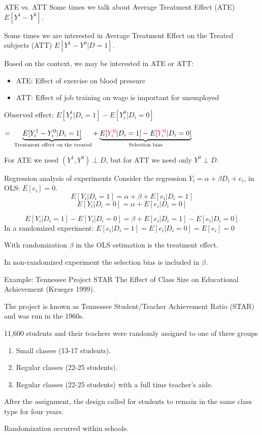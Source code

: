 \documentclass{beamer}
\begin{document}
\begin{frame}{ATE vs. ATT  }
Some times we talk about Average Treatment Effect (ATE) $E[Y^1-Y^0]$.\medskip

Some times we are interested in Average Treatment Effect on the Treated subjects (ATT) $E[Y^1-Y^0|D=1]$.\medskip\pause

Based on the context, we may be interested in ATE or ATT:
\begin{itemize}
\item ATE: Effect of exercise on blood pressure
\item ATT: Effect of job training on wage is important for unemployed
\end{itemize}\medskip
Observed effect: $E[Y_{i}^1|D_i=1]-E[Y_{i}^0|D_i=0]$

$=\underbrace{E[Y_{i}^1-Y_{i}^0|D_i=1]}_{\text{ Treatment effect on the treated}}+\underbrace{E[{\color{red}Y_i^{0}}|D_i=1]-E[{\color{red}Y_i^{0}}|D_i=0]}_{\text{Selection bias}} $\bigskip

For ATE we need $(Y^1,Y^0) \perp D$, but for ATT we need only $Y^0 \perp D$.\medskip


\end{frame}


\begin{frame}{Regression analysis of experiments}
Consider the regression $Y_i=\alpha+\beta D_i+e_i$, in OLS: $E[e_i]=0$. 
\[E[Y_i|D_i=1]=\alpha+\beta+E[e_i|D_i=1] \]
\[E[Y_i|D_i=0]=\alpha+E[e_i|D_i=0] \]

\[E[Y_i|D_i=1]-E[Y_i|D_i=0]=\beta+E[e_i|D_i=1]-E[e_i|D_i=0] \]
In a randomized experiment: $E[e_i|D_i=1]=E[e_i|D_i=0]=E[e_i]=0$\medskip

With randomization $\beta$ in the OLS estimation is the treatment effect.\bigskip

In non-randomized experiment the selection bias is included in $\beta$.
\end{frame}

\begin{frame}{Example: Tennessee Project STAR}
The Effect of Class Size on Educational Achievement (Krueger 1999). \medskip

The project is known as Tennessee Student/Teacher Achievement Ratio (STAR) and was run in the 1960s.\medskip

11,600 students and their teachers were randomly assigned to one of three groups
\begin{enumerate}
\item Small classes (13-17 students).
\item Regular classes (22-25 students).
\item Regular classes (22-25 students) with a full time teacher's aide.
\end{enumerate}

After the assignment, the design called for students to remain in the
same class type for four years.\medskip

Randomization occurred within schools.
\end{frame}
\end{document}
